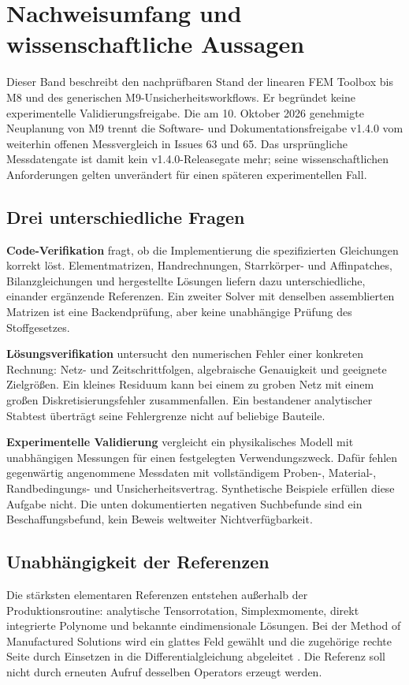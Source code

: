 \chapter{Nachweisumfang und wissenschaftliche Aussagen}
\label{vv:scope}
Dieser Band beschreibt den nachprüfbaren Stand der linearen FEM Toolbox bis M8
und des generischen M9-Unsicherheitsworkflows. Er begründet keine experimentelle
Validierungsfreigabe. Die am 10. Oktober 2026 genehmigte Neuplanung von M9
trennt die Software- und Dokumentationsfreigabe v1.4.0 vom weiterhin offenen
Messvergleich in Issues 63 und 65. Das ursprüngliche Messdatengate ist damit
kein v1.4.0-Releasegate mehr; seine wissenschaftlichen Anforderungen gelten
unverändert für einen späteren experimentellen Fall.

\section{Drei unterschiedliche Fragen}
\textbf{Code-Verifikation} fragt, ob die Implementierung die spezifizierten
Gleichungen korrekt löst. Elementmatrizen, Handrechnungen, Starrkörper- und
Affinpatches, Bilanzgleichungen und hergestellte Lösungen liefern dazu
unterschiedliche, einander ergänzende Referenzen. Ein zweiter Solver mit
denselben assemblierten Matrizen ist eine Backendprüfung, aber keine unabhängige
Prüfung des Stoffgesetzes.

\textbf{Lösungsverifikation} untersucht den numerischen Fehler einer konkreten
Rechnung: Netz- und Zeitschrittfolgen, algebraische Genauigkeit und geeignete
Zielgrößen. Ein kleines Residuum kann bei einem zu groben Netz mit einem großen
Diskretisierungsfehler zusammenfallen. Ein bestandener analytischer Stabtest
überträgt seine Fehlergrenze nicht auf beliebige Bauteile.

\textbf{Experimentelle Validierung} vergleicht ein physikalisches Modell mit
unabhängigen Messungen für einen festgelegten Verwendungszweck. Dafür fehlen
gegenwärtig angenommene Messdaten mit vollständigem Proben-, Material-,
Randbedingungs- und Unsicherheitsvertrag. Synthetische Beispiele erfüllen diese
Aufgabe nicht. Die unten dokumentierten negativen Suchbefunde sind ein
Beschaffungsbefund, kein Beweis weltweiter Nichtverfügbarkeit.

\section{Unabhängigkeit der Referenzen}
Die stärksten elementaren Referenzen entstehen außerhalb der Produktionsroutine:
analytische Tensorrotation, Simplexmomente, direkt integrierte Polynome und
bekannte eindimensionale Lösungen. Bei der Method of Manufactured Solutions
wird ein glattes Feld gewählt und die zugehörige rechte Seite durch Einsetzen
in die Differentialgleichung abgeleitet \cite{sandia-mms}. Die Referenz soll
nicht durch erneuten Aufruf desselben Operators erzeugt werden.

